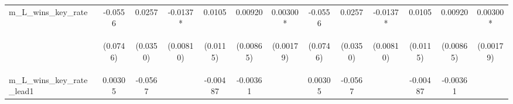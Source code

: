 \documentclass[]{article}
\begin{document}
\begin{center}
\begin{tabular}{lcccccccccccc}
m\_L\_wins\_key\_rate & -0.0556 & 0.0257 & -0.0137* & 0.0105 & 0.00920 & 0.00300* & -0.0556 & 0.0257 & -0.0137* & 0.0105 & 0.00920 & 0.00300* \\
\vspace{4pt} & \begin{footnotesize}(0.0746)\end{footnotesize} & \begin{footnotesize}(0.0350)\end{footnotesize} & \begin{footnotesize}(0.00810)\end{footnotesize} & \begin{footnotesize}(0.0115)\end{footnotesize} & \begin{footnotesize}(0.00865)\end{footnotesize} & \begin{footnotesize}(0.00179)\end{footnotesize} & \begin{footnotesize}(0.0746)\end{footnotesize} & \begin{footnotesize}(0.0350)\end{footnotesize} & \begin{footnotesize}(0.00810)\end{footnotesize} & \begin{footnotesize}(0.0115)\end{footnotesize} & \begin{footnotesize}(0.00865)\end{footnotesize} & \begin{footnotesize}(0.00179)\end{footnotesize} \\
m\_L\_wins\_key\_rate\_lead1 & 0.00305 & -0.0567 &  & -0.00487 & -0.00361 &  & 0.00305 & -0.0567 &  & -0.00487 & -0.00361 &  \\

\end{tabular}
\end{center}
\end{document}
